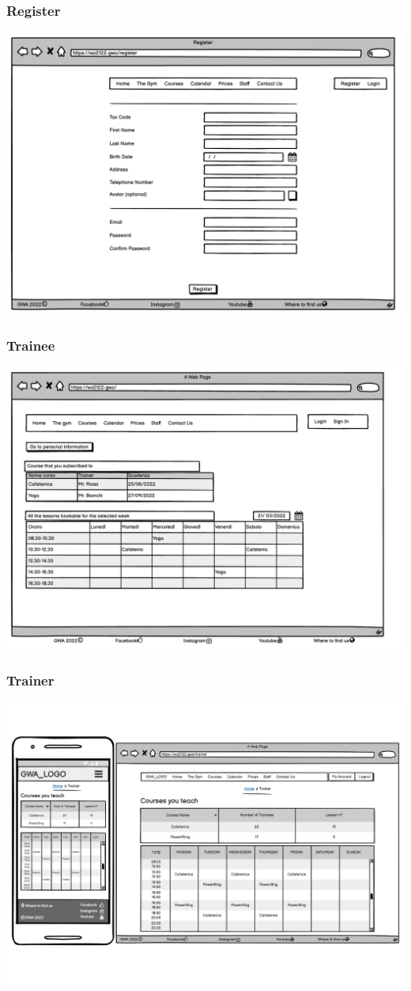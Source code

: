 \subsubsection{Register}
\includegraphics[width=0.8\columnwidth]{InterfaceMockup/register.pdf}

\subsubsection{Trainee}
\includegraphics[width=0.8\columnwidth]{InterfaceMockup/Trainee.pdf}

\subsubsection{Trainer}
\includegraphics[width=0.8\columnwidth]{InterfaceMockup/Trainer/Trainer.pdf}

